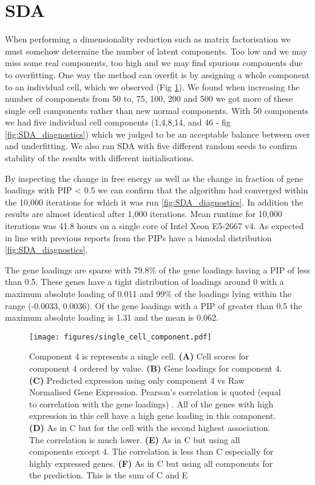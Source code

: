 \section{SDA}

When performing a dimensionality reduction such as matrix factorisation we must somehow determine the number of latent components. Too low and we may miss some real components, too high and we may find spurious components due to overfitting. One way the method can overfit is by assigning a whole component to an individual cell, which we observed (Fig \ref{fig:single_cell_component}). We found when increasing the number of components from 50 to, 75, 100, 200 and 500 we got more of these single cell components rather than new normal components. With 50 components we had five individual cell components (1,4,8,14, and 46 - fig \ref{fig:SDA_diagnostics}) which we judged to be an acceptable balance between over and underfitting. We also ran SDA with five different random seeds to confirm stability of the results with different initialisations.

By inspecting the change in free energy as well as the change in fraction of gene loadings with PIP < 0.5 we can confirm that the algorithm had converged within the 10,000 iterations for which it was run \ref{fig:SDA_diagnostics}. In addition the results are almost identical after 1,000 iterations. Mean runtime for 10,000 iterations was 41.8 hours on a single core of Intel Xeon E5-2667 v4. As expected in line with previous reports from \cite{Hore2016Tensor} the PIPs have a bimodal distribution \ref{fig:SDA_diagnostics}.

The gene loadings are sparse with 79.8\% of the gene loadings having a PIP of less than 0.5. These genes have a tight distribution of loadings around 0 with a maximum absolute loading of 0.011 and 99\% of the loadings lying within the range (-0.0033, 0.0036). Of the gene loadings with a PIP of greater than 0.5 the maximum absolute loading is 1.31 and the mean is 0.062.


\begin{figure}[H]
	\centering
	\texttt{[image: figures/single\_cell\_component.pdf]}
	\caption{Component 4 is represents a single cell.
		\textbf{(A)} Cell scores for component 4 ordered by value.
		\textbf{(B)} Gene loadings for component 4.
		\textbf{(C)} Predicted expression using only component 4 vs Raw Normalised Gene Expression. Pearson's correlation is quoted (equal to correlation with the gene loadings) . All of the genes with high expression in this cell have a high gene loading in this component.
		\textbf{(D)} As in C but for the cell with the second highest association. The correlation is much lower. 
		\textbf{(E)} As in C but using all components except 4. The correlation is less than C especially for highly expressed genes.
		\textbf{(F)} As in C but using all components for the prediction.  This is the sum of C and E
	}
	\label{fig:single_cell_component}
\end{figure}

